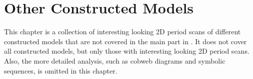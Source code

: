 \chapter{Other Constructed Models}
\label{chap:app.models}

This chapter is a collection of interesting looking 2D period scans of different constructed models that are not covered in the main part in .
It does not cover all constructed models, but only those with interesting looking 2D period scans.
Also, the more detailed analysis, such as cobweb diagrams and symbolic sequences, is omitted in this chapter.


\clearpage


